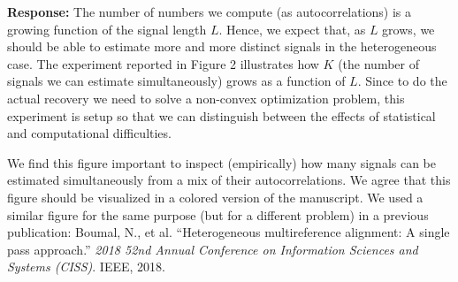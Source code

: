 \documentclass[12pt]{article}
\newcommand{\1}{\mathbf{1}}
\theoremstyle{plain}
\theoremstyle{definition}
\theoremstyle{remark}
\theoremstyle{plain}
\theoremstyle{remark}
\theoremstyle{plain}
\theoremstyle{plain}
\theoremstyle{plain}
\numberwithin{equation}{section}
\begin{document}
\noindent \textbf{Response:} The number of numbers we compute (as autocorrelations) is a growing function of the signal length $L$. Hence, we expect that, as $L$ grows, we should be able to estimate more and more distinct signals in the heterogeneous case. The experiment reported in Figure 2 illustrates how $K$ (the number of signals we can estimate simultaneously) grows as a function of $L$. Since to do the actual recovery we need to solve a non-convex optimization problem, this experiment is setup so that we can distinguish between the effects of statistical and computational difficulties.

We find this figure important to inspect (empirically) how many signals can be estimated simultaneously from a mix of their autocorrelations. We agree that this figure should be visualized in a colored version of the manuscript. We used a similar figure for the same purpose (but for a different problem) in a previous publication: Boumal, N., et al. ``Heterogeneous multireference alignment: A single pass approach.'' \emph{2018 52nd Annual Conference on Information Sciences and Systems (CISS)}. IEEE, 2018.
\end{document}
